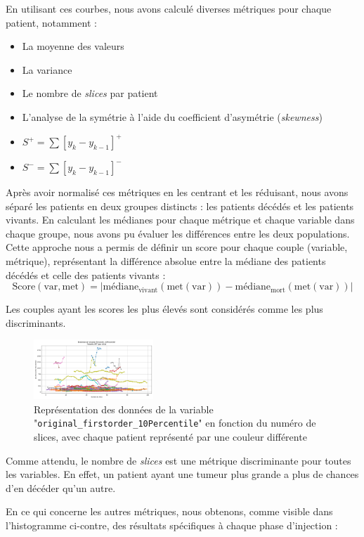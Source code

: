 En utilisant ces courbes, nous avons calculé diverses métriques pour chaque patient, notamment :
\begin{itemize}
\item La moyenne des valeurs
\item La variance
\item Le nombre de \textit{slices} par patient
\item L’analyse de la symétrie à l’aide du coefficient d'asymétrie (\textit{skewness})
\item $S^+ = \sum [y_k - y_{k-1}]^+$
\item $S^- = \sum [y_k - y_{k-1}]^-$
\end{itemize}

Après avoir normalisé ces métriques en les centrant et les réduisant, nous avons séparé les patients en deux groupes distincts : les patients décédés et les patients vivants. En calculant les médianes pour chaque métrique et chaque variable dans chaque groupe, nous avons pu évaluer les différences entre les deux populations. Cette approche nous a permis de définir un score pour chaque couple (variable, métrique), représentant la différence absolue entre la médiane des patients décédés et celle des patients vivants :
$$
\scriptstyle \text{Score}(\text{var}, \text{met}) = \left| \text{médiane}_{\text{vivant}}(\text{met}(\text{var})) - \text{médiane}_{\text{mort}}(\text{met}(\text{var})) \right|
$$

Les couples ayant les scores les plus élevés sont considérés comme les plus discriminants.

\begin{figure}[H]
    \centering
    \includegraphics[width=0.4\textwidth]{img/Figure_1.png}
    \caption{Représentation des données de la variable "\texttt{original\_firstorder\_10Percentile}" en fonction du numéro de slices, avec chaque patient représenté par une couleur différente}
\end{figure}


Comme attendu, le nombre de \textit{slices} est une métrique discriminante pour toutes les variables. En effet, un patient ayant une tumeur plus grande a plus de chances d’en décéder qu’un autre.

En ce qui concerne les autres métriques, nous obtenons, comme visible dans l’histogramme ci-contre, des résultats spécifiques à chaque phase d’injection :


